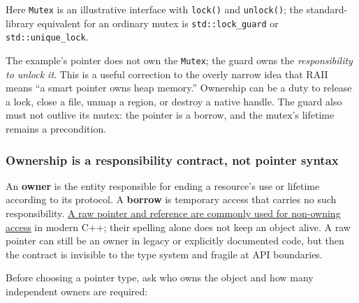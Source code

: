 Here \texttt{Mutex} is an illustrative interface with \texttt{lock()} and \texttt{unlock()}; the standard-library equivalent for an ordinary mutex is \texttt{std::lock\_guard} or \texttt{std::unique\_lock}.

The example's pointer does not own the \texttt{Mutex}; the guard owns the \emph{responsibility to unlock it}. This is a useful correction to the overly narrow idea that RAII means ``a smart pointer owns heap memory.'' Ownership can be a duty to release a lock, close a file, unmap a region, or destroy a native handle. The guard also must not outlive its mutex: the pointer is a borrow, and the mutex's lifetime remains a precondition.

\subsubsection{Ownership is a responsibility contract, not pointer syntax}\label{ownership-is-a-responsibility-contract-not-pointer-syntax}

An \textbf{owner} is the entity responsible for ending a resource's use or lifetime according to its protocol. A \textbf{borrow} is temporary access that carries no such responsibility. \hyperref[appendix-d52e4486f527]{A raw pointer and reference are commonly used for non-owning access} in modern C++; their spelling alone does not keep an object alive. A raw pointer can still be an owner in legacy or explicitly documented code, but then the contract is invisible to the type system and fragile at API boundaries.

Before choosing a pointer type, ask who owns the object and how many independent owners are required:

